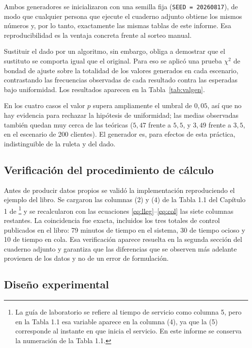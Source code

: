 \documentclass[11pt,letterpaper]{article}
\begin{document}
Ambos generadores se inicializaron con una semilla fija (\texttt{SEED = 20260817}), de modo que cualquier persona que ejecute el cuaderno adjunto obtiene los mismos números y, por lo tanto, exactamente las mismas tablas de este informe. Esa reproducibilidad es la ventaja concreta frente al sorteo manual.

Sustituir el dado por un algoritmo, sin embargo, obliga a demostrar que el sustituto se comporta igual que el original. Para eso se aplicó una prueba $\chi^2$ de bondad de ajuste sobre la totalidad de los valores generados en cada escenario, contrastando las frecuencias observadas de cada resultado contra las esperadas bajo uniformidad. Los resultados aparecen en la Tabla~\ref{tab:valgen}.



En los cuatro casos el valor $p$ supera ampliamente el umbral de $0{,}05$, así que no hay evidencia para rechazar la hipótesis de uniformidad; las medias observadas también quedan muy cerca de las teóricas ($5{,}47$ frente a $5{,}5$, y $3{,}49$ frente a $3{,}5$, en el escenario de 200 clientes). El generador es, para efectos de esta práctica, indistinguible de la ruleta y del dado.

\subsection{Verificación del procedimiento de cálculo}

Antes de producir datos propios se validó la implementación reproduciendo el ejemplo del libro. Se cargaron las columnas (2) y (4) de la Tabla 1.1 del Capítulo 1 de \cite{Banks1998}\footnote{La guía de laboratorio se refiere al tiempo de servicio como \guillemotleft columna 5\guillemotright, pero en la Tabla 1.1 esa variable aparece en la columna (4), ya que la (5) corresponde al instante en que inicia el servicio. En este informe se conserva la numeración de la Tabla 1.1.} y se recalcularon con las ecuaciones \eqref{eq:lleg}--\eqref{eq:col} las siete columnas restantes. La coincidencia fue exacta, incluidos los tres totales de control publicados en el libro: 79 minutos de tiempo en el sistema, 30 de tiempo ocioso y 10 de tiempo en cola. Esa verificación aparece resuelta en la segunda sección del cuaderno adjunto y garantiza que las diferencias que se observen más adelante provienen de los datos y no de un error de formulación.

\subsection{Diseño experimental}
\end{document}
